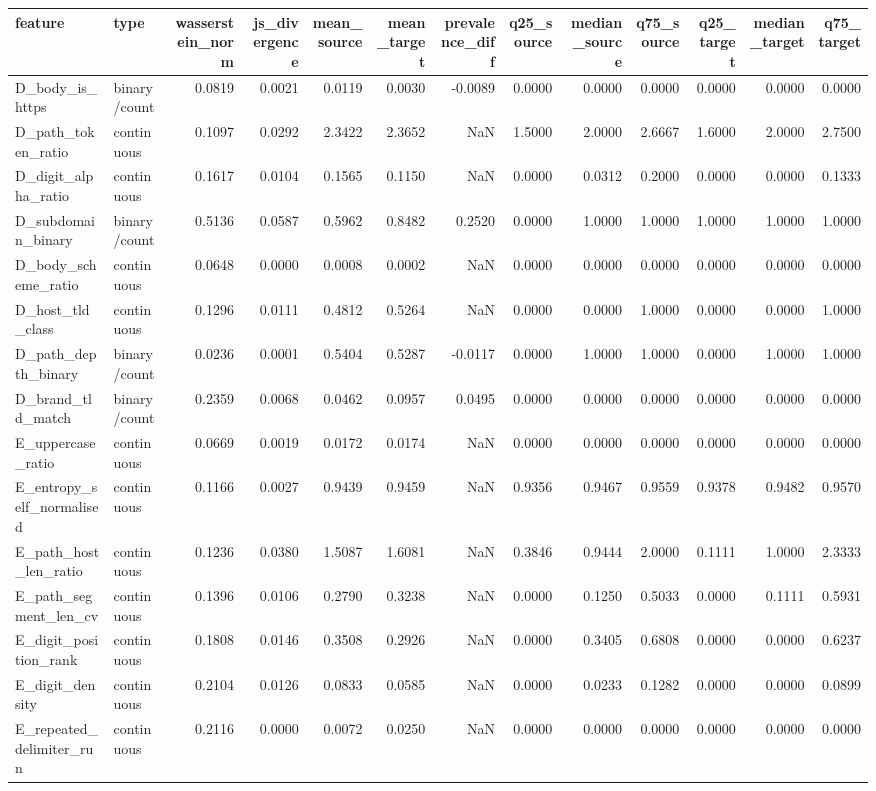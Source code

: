 \begin{tabular}{llrrrrrrrrrrr}
\toprule
feature & type & wasserstein\_norm & js\_divergence & mean\_source & mean\_target & prevalence\_diff & q25\_source & median\_source & q75\_source & q25\_target & median\_target & q75\_target \\
\midrule
D\_body\_is\_https & binary/count & 0.0819 & 0.0021 & 0.0119 & 0.0030 & -0.0089 & 0.0000 & 0.0000 & 0.0000 & 0.0000 & 0.0000 & 0.0000 \\
D\_path\_token\_ratio & continuous & 0.1097 & 0.0292 & 2.3422 & 2.3652 & NaN & 1.5000 & 2.0000 & 2.6667 & 1.6000 & 2.0000 & 2.7500 \\
D\_digit\_alpha\_ratio & continuous & 0.1617 & 0.0104 & 0.1565 & 0.1150 & NaN & 0.0000 & 0.0312 & 0.2000 & 0.0000 & 0.0000 & 0.1333 \\
D\_subdomain\_binary & binary/count & 0.5136 & 0.0587 & 0.5962 & 0.8482 & 0.2520 & 0.0000 & 1.0000 & 1.0000 & 1.0000 & 1.0000 & 1.0000 \\
D\_body\_scheme\_ratio & continuous & 0.0648 & 0.0000 & 0.0008 & 0.0002 & NaN & 0.0000 & 0.0000 & 0.0000 & 0.0000 & 0.0000 & 0.0000 \\
D\_host\_tld\_class & continuous & 0.1296 & 0.0111 & 0.4812 & 0.5264 & NaN & 0.0000 & 0.0000 & 1.0000 & 0.0000 & 0.0000 & 1.0000 \\
D\_path\_depth\_binary & binary/count & 0.0236 & 0.0001 & 0.5404 & 0.5287 & -0.0117 & 0.0000 & 1.0000 & 1.0000 & 0.0000 & 1.0000 & 1.0000 \\
D\_brand\_tld\_match & binary/count & 0.2359 & 0.0068 & 0.0462 & 0.0957 & 0.0495 & 0.0000 & 0.0000 & 0.0000 & 0.0000 & 0.0000 & 0.0000 \\
E\_uppercase\_ratio & continuous & 0.0669 & 0.0019 & 0.0172 & 0.0174 & NaN & 0.0000 & 0.0000 & 0.0000 & 0.0000 & 0.0000 & 0.0000 \\
E\_entropy\_self\_normalised & continuous & 0.1166 & 0.0027 & 0.9439 & 0.9459 & NaN & 0.9356 & 0.9467 & 0.9559 & 0.9378 & 0.9482 & 0.9570 \\
E\_path\_host\_len\_ratio & continuous & 0.1236 & 0.0380 & 1.5087 & 1.6081 & NaN & 0.3846 & 0.9444 & 2.0000 & 0.1111 & 1.0000 & 2.3333 \\
E\_path\_segment\_len\_cv & continuous & 0.1396 & 0.0106 & 0.2790 & 0.3238 & NaN & 0.0000 & 0.1250 & 0.5033 & 0.0000 & 0.1111 & 0.5931 \\
E\_digit\_position\_rank & continuous & 0.1808 & 0.0146 & 0.3508 & 0.2926 & NaN & 0.0000 & 0.3405 & 0.6808 & 0.0000 & 0.0000 & 0.6237 \\
E\_digit\_density & continuous & 0.2104 & 0.0126 & 0.0833 & 0.0585 & NaN & 0.0000 & 0.0233 & 0.1282 & 0.0000 & 0.0000 & 0.0899 \\
E\_repeated\_delimiter\_run & continuous & 0.2116 & 0.0000 & 0.0072 & 0.0250 & NaN & 0.0000 & 0.0000 & 0.0000 & 0.0000 & 0.0000 & 0.0000 \\
\bottomrule
\end{tabular}
